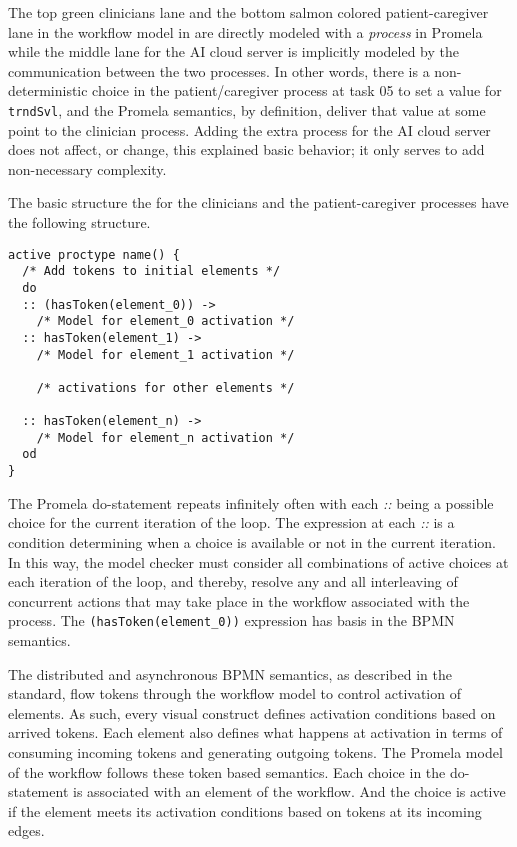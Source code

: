 The top green clinicians lane and the bottom salmon colored patient-caregiver lane in the workflow model in  are directly modeled with a \emph{process} in Promela while the middle lane for the AI cloud server is implicitly modeled by the communication between the two processes. In other words, there is a non-deterministic choice in the patient/caregiver process at task 05 to set a value for \texttt{trndSvl}, and the Promela semantics, by definition, deliver that value at some point to the clinician process. Adding the extra process for the AI cloud server does not affect, or change, this explained basic behavior; it only serves to add non-necessary complexity.

The basic structure the for the clinicians and the patient-caregiver processes have the following structure.
%
{\small
\begin{lstlisting}[style=myPromela]
active proctype name() {
  /* Add tokens to initial elements */
  do
  :: (hasToken(element_0)) ->
    /* Model for element_0 activation */
  :: hasToken(element_1) ->
    /* Model for element_1 activation */
 
    /* activations for other elements */
    
  :: hasToken(element_n) ->
    /* Model for element_n activation */
  od
}
\end{lstlisting}
}
%
\noindent The Promela do-statement repeats infinitely often with each \emph{::} being a possible choice for the current iteration of the loop. The expression at each \emph{::} is a condition determining when a choice is available or not in the current iteration. In this way, the model checker must consider all combinations of active choices at each iteration of the loop, and thereby, resolve any and all interleaving of concurrent actions that may take place in the workflow associated with the process. The \texttt{(hasToken(element\_0))} expression has basis in the BPMN semantics.

The distributed and asynchronous BPMN semantics, as described in the standard, flow tokens through the workflow model to control activation of elements. As such, every visual construct defines activation conditions based on arrived tokens. Each element also defines what happens at activation in terms of consuming incoming tokens and generating outgoing tokens. The Promela model of the workflow follows these token based semantics. Each choice in the do-statement is associated with an element of the workflow. And the choice is active if the element meets its activation conditions based on tokens at its incoming edges.

